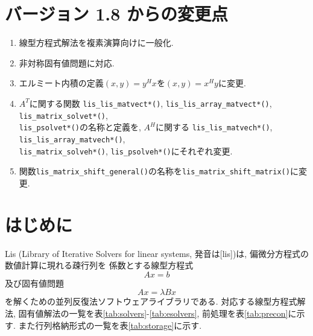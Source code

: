 \documentclass[a4paper]{jarticle}
\begin{document}
\section*{バージョン 1.8 からの変更点}
\begin{enumerate}
\item 線型方程式解法を複素演算向けに一般化.
\item 非対称固有値問題に対応.
\item エルミート内積の定義$(x,y)=y^{H}x$を$(x,y)=x^{H}y$に変更.
\item $A^T$に関する関数
      {\tt lis\_lis\_matvect*()}, 
      {\tt lis\_lis\_array\_matvect*()}, 
      {\tt lis\_matrix\_solvet*()}, \\
      {\tt lis\_psolvet*()}の名称と定義を, $A^H$に関する
      {\tt lis\_lis\_matvech*()}, 
      {\tt lis\_lis\_array\_matvech*()}, \\  
      {\tt lis\_matrix\_solveh*()}, 
      {\tt lis\_psolveh*()}にそれぞれ変更.
\item 関数{\tt lis\_matrix\_shift\_general()}の名称を{\tt lis\_matrix\_shift\_matrix()}に変更. 
\end{enumerate}

\newpage
\section{はじめに}
Lis (Library of Iterative Solvers for linear systems, 発音は[lis])は, 
偏微分方程式の数値計算に現れる疎行列を
係数とする線型方程式 
\[
Ax = b
\]
及び固有値問題
\[
Ax = \lambda Bx
\]
を解くための並列反復法ソフトウェアライブラリである\cite{nishida1}. 
対応する線型方程式解法, 固有値解法の一覧を表\ref{tab:solvers}-\ref{tab:esolvers}, 
前処理を表\ref{tab:precon}に示す. 
また行列格納形式の一覧を表\ref{tab:storage}に示す. 
\end{document}
